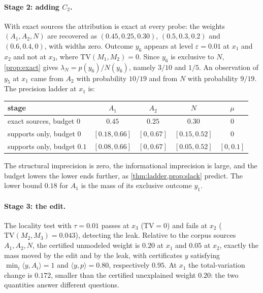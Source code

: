 \documentclass[11pt]{article}
\theoremstyle{definition}
\theoremstyle{remark}
\newcommand{\TV}{\mathrm{TV}}
\begin{document}
\paragraph{Stage 2: adding $C_2$.} With exact sources the attribution is exact at every probe: the
weights $(A_1,A_2,N)$ are recovered as $(0.45,0.25,0.30)$, $(0.5,0.3,0.2)$ and $(0.6,0.4,0)$, with widths
zero. Outcome $y_6$ appears at level $\varepsilon=0.01$ at $x_1$ and $x_2$ and not at $x_3$, where
$\TV(M_1,M_2)=0$. Since $y_6$ is exclusive to $N$, \cref{prop:exact} gives $\lambda_N=p(y_6)/N(y_6)$,
namely $3/10$ and $1/5$. An observation of $y_5$ at $x_1$ came from $A_2$ with probability $10/19$ and
from $N$ with probability $9/19$. The precision ladder at $x_1$ is:
\begin{center}\small
\begin{tabular}{@{}lcccc@{}}
\toprule
stage & $A_1$ & $A_2$ & $N$ & $\mu$\\
\midrule
exact sources, budget $0$ & $0.45$ & $0.25$ & $0.30$ & $0$\\
supports only, budget $0$ & $[0.18,0.66]$ & $[0,0.67]$ & $[0.15,0.52]$ & $0$\\
supports only, budget $0.1$ & $[0.08,0.66]$ & $[0,0.67]$ & $[0.05,0.52]$ & $[0,0.1]$\\
\bottomrule
\end{tabular}
\end{center}
The structural imprecision is zero, the informational imprecision is large, and the budget lowers the
lower ends further, as \cref{thm:ladder,prop:slack} predict. The lower bound $0.18$ for $A_1$ is the mass of
its exclusive outcome $y_1$.

\paragraph{Stage 3: the edit.} The locality test with $\tau=0.01$ passes at $x_3$ ($\TV=0$) and fails at
$x_2$ ($\TV(M_2,M_3)=0.043$), detecting the leak. Relative to the corpus sources $A_1,A_2,N$, the
certified unmodeled weight is $0.20$ at $x_1$ and $0.05$ at $x_2$, exactly the mass moved by the edit
and by the leak, with certificates $y$ satisfying $\min_i\langle y,A_i\rangle=1$ and $\langle
y,p\rangle=0.80$, respectively $0.95$. At $x_1$ the total-variation change is $0.172$, smaller than the
certified unexplained weight $0.20$: the two quantities answer different questions.
\end{document}
